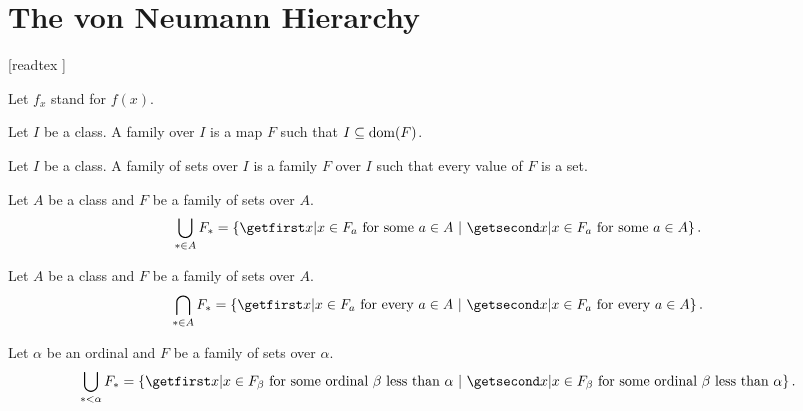\documentclass[../set-theory.tex]{subfiles}
\begin{document}
  \chapter{The von Neumann Hierarchy}


  \begin{forthel}

    [readtex ]

  \end{forthel}


  \begin{forthel}

    Let $f_{x}$ stand for $f(x)$.

    \begin{definition}
      Let $I$ be a class.
      A family over $I$ is a map $F$ such that $I \subseteq \operatorname{dom}(F)$.
    \end{definition}

    \begin{definition}
      Let $I$ be a class.
      A family of sets over $I$ is a family $F$ over $I$ such that every value
      of $F$ is a set.
    \end{definition}

    \begin{definition}
      Let $A$ be a class and $F$ be a family of sets over $A$.
      \[ \bigcup_{* \in A} F_{*} = \class{x | \text{$x \in F_{a}$ for some
      $a \in A$}}. \]
    \end{definition}

    \begin{definition}
      Let $A$ be a class and $F$ be a family of sets over $A$.
      \[ \bigcap_{* \in A} F_{*} = \class{x | \text{$x \in F_{a}$ for every
      $a \in A$}}. \]
    \end{definition}
  \end{forthel}

  \begin{forthel}
    \begin{definition}
      Let $\alpha$ be an ordinal and $F$ be a family of sets over $\alpha$.
      \[ \bigcup_{* < \alpha} F_{*} = \class{x | \text{$x \in F_{\beta}$ for
      some ordinal $\beta$ less than $\alpha$}}. \]
    \end{definition}
  \end{forthel}
\end{document}
